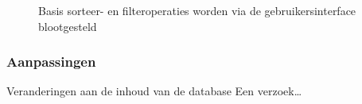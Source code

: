 \begin{figure}[ht]
  \centering
  \hfill%
  \caption{Basis sorteer- en filteroperaties worden via de gebruikersinterface blootgesteld}
  \label{fig:tangfiltersort}
\end{figure}


\subsubsection{Aanpassingen}
Veranderingen aan de inhoud van de database 
Een verzoek\ldots

